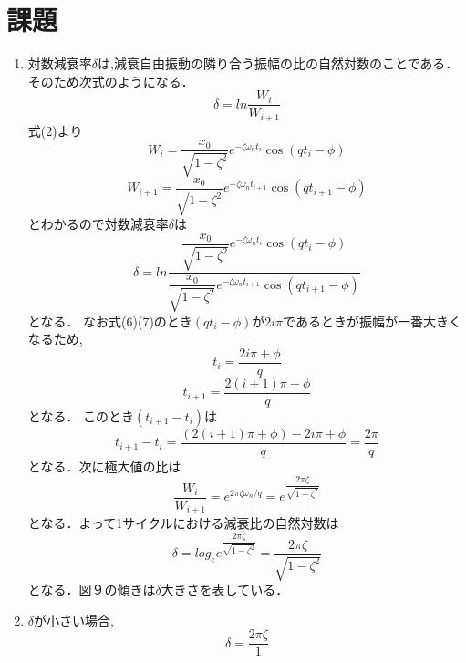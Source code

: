 \documentclass[a4paper,10.5pt]{jsarticle}
\begin{document}
\section{課題}
\begin{enumerate}
  \item 
対数減衰率$\delta$は,減衰自由振動の隣り合う振幅の比の自然対数のことである．そのため次式のようになる．
\begin{equation}
  \delta = {ln\dfrac{W_i}{W_{i+1}}}
\end{equation}
式(2)より
\begin{equation}
  W_i = {\dfrac{x_0}{\sqrt{1-\zeta^2}}e^{-\zeta {\omega}_{n} t_i}\cos (qt_i-\phi)}
\end{equation}
\begin{equation}
  W_{i+1} = {\dfrac{x_0}{\sqrt{1-\zeta^2}}e^{-\zeta {\omega}_{n} t_{i+1}}\cos (qt_{i+1}-\phi)}
\end{equation}
とわかるので対数減衰率$\delta$は
\begin{equation}
  \delta = ln{\dfrac{\dfrac{x_0}{\sqrt{1-\zeta^2}}e^{-\zeta {\omega}_{n} t_i}\cos (qt_i-\phi)}{\dfrac{x_0}{\sqrt{1-\zeta^2}}e^{-\zeta {\omega}_{n} t_{i+1}}\cos (qt_{i+1}-\phi)}}
\end{equation}
となる．
なお式(6)(7)のとき$(qt_{i}-\phi)$が$2i\pi$であるときが振幅が一番大きくなるため,
\begin{equation}
  t_i = {\dfrac{2i\pi+\phi}{q}}
\end{equation}
\begin{equation}
  t_{i+1} = {\dfrac{2(i+1)\pi+\phi}{q}}
\end{equation}
となる．
このとき$(t_{i+1}-t_{i})$は
\begin{equation}
  t_{i+1}-t_{i} = {\dfrac{(2(i+1)\pi+\phi)-2i\pi+\phi}{q}} = {\dfrac{2\pi}{q}}
\end{equation}
となる．次に極大値の比は
\begin{equation}
  {\dfrac{W_i}{W_{i+1}}} = e^{{2\pi\zeta\omega_n}/q} = e^{\dfrac{2\pi\zeta}{\sqrt{1-\zeta^2}}}
\end{equation}
となる．よって1サイクルにおける減衰比の自然対数は
\begin{equation}
  \delta = log_e{e^{\dfrac{2\pi\zeta}{\sqrt{1-\zeta^2}}}} = {\dfrac{2\pi\zeta}{\sqrt{1-\zeta^2}}}
\end{equation}
となる．図９の傾きは$\delta$大きさを表している．
  \item $\delta$が小さい場合,
  \begin{equation}
    \delta = {\dfrac{2\pi\zeta}{{1}}}
  \end{equation}

\end{enumerate}
\end{document}
